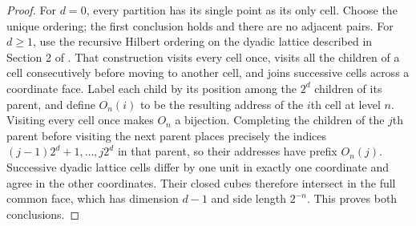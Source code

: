 \begin{proof}
For $d=0$, every partition has its single point as its only cell. Choose the unique ordering; the first conclusion holds and there are no adjacent pairs. For $d\geqslant1$, use the recursive Hilbert ordering on the dyadic lattice described in Section 2 of \cite{hamiltonCompactHilbertIndices2007}. That construction visits every cell once, visits all the children of a cell consecutively before moving to another cell, and joins successive cells across a coordinate face. Label each child by its position among the $2^d$ children of its parent, and define $O_n(i)$ to be the resulting address of the $i$th cell at level $n$. Visiting every cell once makes $O_n$ a bijection. Completing the children of the $j$th parent before visiting the next parent places precisely the indices $(j-1)2^d+1,\ldots,j2^d$ in that parent, so their addresses have prefix $O_n(j)$. Successive dyadic lattice cells differ by one unit in exactly one coordinate and agree in the other coordinates. Their closed cubes therefore intersect in the full common face, which has dimension $d-1$ and side length $2^{-n}$. This proves both conclusions.
\end{proof}

